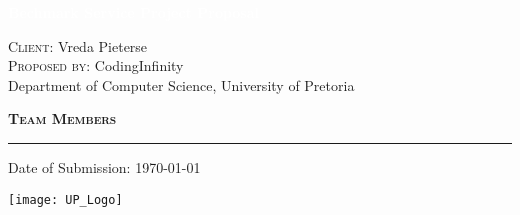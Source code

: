 \documentclass[11pt,a4paper,sans]{article}
\begin{document}
\begin{titlepage}
\BgThispage
{}
\vspace*{0.1\textheight}
\noindent
\textcolor{white}{\Huge\textbf{\textsf{Bechmark Service Project Proposal}}}
\vspace*{4cm}
\noindent
\begin{center}
			\textsc{Client:} {\huge Vreda Pieterse} \\
			\vspace*{0.3cm}
			\textsc{Proposed by:} {\huge CodingInfinity} \\
			\vspace*{0.1cm}
			\small Department of Computer Science, University of Pretoria \\
			\hfill
\end{center}
\vspace*{1.5cm}
\begin{minipage}{0.35\linewidth}
		\begin{center}
			\textsc{\textbf{Team Members}}
		\end{center}
    \begin{flushright}
        
    \end{flushright}
\end{minipage} \hspace{15pt}
\begin{minipage}{0.02\linewidth}
    \rule{1pt}{140pt}
\end{minipage} \hspace{-10pt}
\begin{minipage}{0.63\linewidth}
\vspace{5pt}
  \begin{abstract}
		There are many cases in industry, in education and in research where benchmarking of software, whether that be a full software system, algorithm or data structure is of utmost importance. In industry one would like to be able to benchmark software to validate that quality requirements are met and in education one would like to be able to demonstrate the importance of correct and efficient software implementation, especially in data strcutures, while in research one would seek to validate the time and space complexity of new algorithms. This software proposal propses a benchmarking service which could be used by industry, education and research to achieve the stated goals.

		This proposal is made in request to the call for tenders published by Vreda Pieterse through the University of Pretoria.
	\end{abstract}
\end{minipage}

\vspace*{1cm}
{\large Date of Submission:} \today
\vfill
\begin{minipage}{\linewidth}
	\begin{center}
		\texttt{[image: UP\_Logo]}
	\end{center}
\end{minipage}
\end{titlepage}
\restoregeometry
\end{document}
